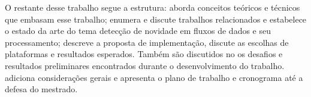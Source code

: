 
O restante desse trabalho segue a estrutura:
 aborda conceitos teóricos e técnicos que embasam
esse trabalho;
 enumera e discute trabalhos relacionados e estabelece
o estado da arte do tema detecção de novidade em fluxos de dados e seu processamento;
 descreve a proposta de implementação, discute
as escolhas de plataformas e resultados esperados.
Também são discutidos no  os desafios e resultados preliminares encontrados
durante o desenvolvimento do trabalho.
 adiciona considerações gerais e apresenta o plano de trabalho
e cronograma até a defesa do mestrado.
